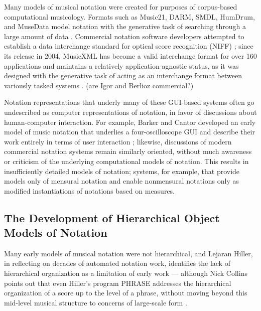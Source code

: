 Many models of musical notation were created for purposes of corpus-based computational musicology. Formats such as Music21, DARM, SMDL, HumDrum, and MuseData model notation with the generative task of searching through a large amount of data \cite{Selfridge-Field:1997ud}. Commercial notation software developers attempted to establish a data interchange standard for optical score recognition (NIFF) \cite{niff1995niff}; since its release in 2004, MusicXML has become a valid interchange format for over 160 applications and maintains a relatively application-agnostic status, as it was designed with the generative task of acting as an interchange format between variously tasked systems \cite{Good:2001if}. (are Igor and Berlioz commercial?)

Notation representations that underly many of these GUI-based systems often go undescribed as computer representations of notation, in favor of discussions about human-computer interaction. For example, Barker and Cantor developed an early model of music notation that underlies a four-oscilloscope GUI and describe their work entirely in terms of user interaction \cite{cantor1971computer}; likewise, discussions of modern commercial notation systems remain similarly oriented, without much awareness or criticism of the underlying computational models of notation. This results in insufficiently detailed models of notation; systems, for example, that provide models only of mensural notation and enable nonmensural notations only as modified instantiations of notations based on measures.

\subsection{The Development of Hierarchical Object Models of Notation}
Many early models of musical notation were not hierarchical, and Lejaran Hiller, in reflecting on decades of automated notation work, identifies the lack of hierarchical organization as a limitation of early work --- although Nick Collins points out that even Hiller's program PHRASE addresses the hierarchical organization of a score up to the level of a phrase, without moving beyond this mid-level musical structure to concerns of large-scale form \cite[108]{Collins2009}. 

